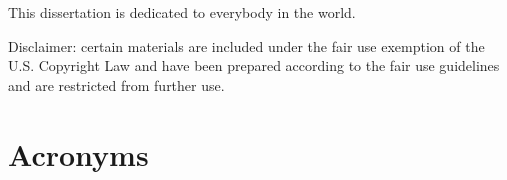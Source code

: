 \begin{frontmatter}
	\begin{dedication}
	
	This dissertation is dedicated to everybody in the world.
	
	\end{dedication}
	
	\tableofcontents
	
	\listoftables
	
	\listoffigures
	
	Disclaimer: certain materials are included under the fair use exemption of the U.S. Copyright Law and have been prepared according to the fair use guidelines and are restricted from further use.
	
	\pagebreak
	\section*{Acronyms}
	\begin{acronym}
	
	\end{acronym}
	
	\end{frontmatter}
	
	